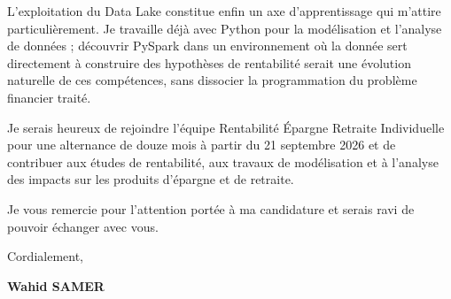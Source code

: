 \documentclass[11pt,a4paper]{article}
\begin{document}
L'exploitation du Data Lake constitue enfin un axe d'apprentissage qui m'attire particulièrement. Je travaille déjà avec Python pour la modélisation et l'analyse de données ; découvrir PySpark dans un environnement où la donnée sert directement à construire des hypothèses de rentabilité serait une évolution naturelle de ces compétences, sans dissocier la programmation du problème financier traité.

Je serais heureux de rejoindre l'équipe Rentabilité Épargne Retraite Individuelle pour une alternance de douze mois à partir du 21 septembre 2026 et de contribuer aux études de rentabilité, aux travaux de modélisation et à l'analyse des impacts sur les produits d'épargne et de retraite.

Je vous remercie pour l'attention portée à ma candidature et serais ravi de pouvoir échanger avec vous.

Cordialement,

\vspace{0.15cm}
\textbf{Wahid SAMER}
\end{document}
